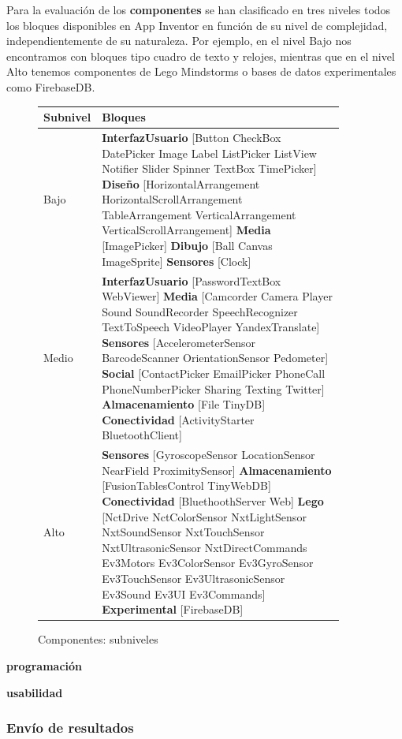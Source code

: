 \documentclass[a4paper, 12pt]{book}
\begin{document}
Para la evaluación de los \textbf{componentes} se han clasificado en tres niveles todos los bloques disponibles en App Inventor en función de su nivel de complejidad, independientemente de su naturaleza. Por ejemplo, en el nivel Bajo nos encontramos con bloques tipo cuadro de texto y relojes, mientras que en el nivel Alto tenemos componentes de Lego Mindstorms o bases de datos experimentales como FirebaseDB. 

\begin{figure}[H]
	\begin{center}
	    \begin{tabular}{| l | p{0.90\linewidth} | }
	    \hline
	    \textbf{Subnivel} & \textbf{Bloques} \\ \hline
		Bajo & \textbf{InterfazUsuario} [Button CheckBox DatePicker Image Label ListPicker ListView Notifier Slider Spinner TextBox TimePicker] \textbf{Diseño} [HorizontalArrangement HorizontalScrollArrangement TableArrangement VerticalArrangement VerticalScrollArrangement] \textbf{Media} [ImagePicker] \textbf{Dibujo} [Ball Canvas ImageSprite] \textbf{Sensores} [Clock] \\ \hline
		Medio & \textbf{InterfazUsuario} [PasswordTextBox WebViewer] \textbf{Media} [Camcorder Camera Player Sound SoundRecorder SpeechRecognizer TextToSpeech VideoPlayer YandexTranslate] \textbf{Sensores} [AccelerometerSensor BarcodeScanner OrientationSensor Pedometer] \textbf{Social} [ContactPicker EmailPicker PhoneCall PhoneNumberPicker Sharing Texting Twitter] \textbf{Almacenamiento} [File TinyDB] \textbf{Conectividad} [ActivityStarter BluetoothClient]\\ \hline
		Alto & \textbf{Sensores} [GyroscopeSensor LocationSensor NearField ProximitySensor] \textbf{Almacenamiento} [FusionTablesControl TinyWebDB] \textbf{Conectividad} [BluethoothServer Web] \textbf{Lego} [NctDrive NctColorSensor NxtLightSensor NxtSoundSensor NxtTouchSensor NxtUltrasonicSensor NxtDirectCommands Ev3Motors Ev3ColorSensor Ev3GyroSensor Ev3TouchSensor Ev3UltrasonicSensor Ev3Sound Ev3UI Ev3Commands] \textbf{Experimental} [FirebaseDB]\\ \hline
            \end{tabular}
	\end{center}
	\caption{Componentes: subniveles}
	\label{fig:componentsScore}
\end{figure}


\textbf{programación}

\textbf{usabilidad}

\subsubsection{Envío de resultados}
\end{document}
